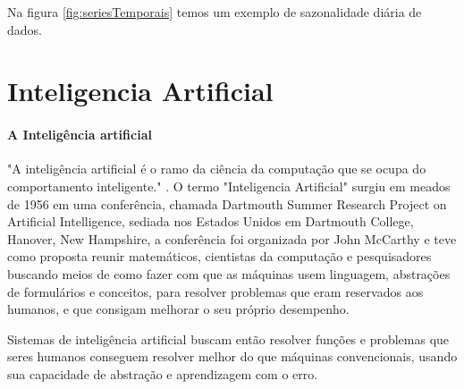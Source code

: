\documentclass[	12pt, Times, openright, twoside, a4paper, english, brazil]{abntex2}
\begin{document}
          Na figura \ref{fig:seriesTemporais} temos um exemplo de sazonalidade diária de dados.

          \begin{figure}[H]
          \end{figure}

      \section{Inteligencia Artificial}
        \paragraph*{A Inteligência artificial} "A inteligência artificial é o ramo da ciência da computação que se ocupa do comportamento inteligente." \cite{Luger2004}.
          O termo "Inteligencia Artificial" surgiu em meados de 1956 em uma conferência, chamada Dartmouth Summer Research Project on Artificial Intelligence, sediada nos Estados Unidos em Dartmouth College, Hanover, New Hampshire, a conferência foi organizada por John McCarthy e teve como proposta reunir matemáticos, cientistas da computação e pesquisadores buscando meios de como fazer com que as máquinas usem linguagem, abstrações de formulários e conceitos, para resolver problemas que eram reservados aos humanos, e que consigam melhorar o seu próprio desempenho.

          Sistemas de inteligência artificial buscam então resolver funções e problemas que seres humanos conseguem resolver melhor do que máquinas convencionais, usando sua capacidade de abstração e aprendizagem com o erro.
\end{document}

